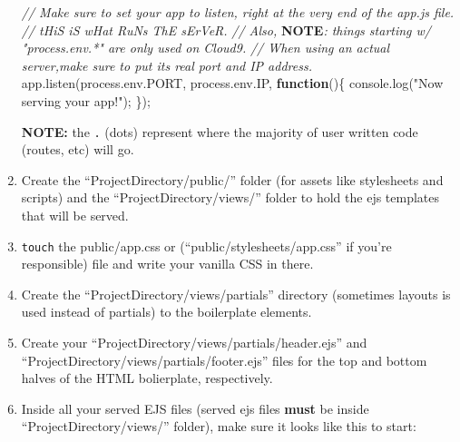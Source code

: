 \documentclass[11pt]{article}
\newenvironment{Shaded}{}{}
\newcommand{\KeywordTok}[1]{\textcolor[rgb]{0.00,0.44,0.13}{\textbf{{#1}}}}
\newcommand{\StringTok}[1]{\textcolor[rgb]{0.25,0.44,0.63}{{#1}}}
\newcommand{\CommentTok}[1]{\textcolor[rgb]{0.38,0.63,0.69}{\textit{{#1}}}}
\newcommand{\AlertTok}[1]{\textcolor[rgb]{1.00,0.00,0.00}{\textbf{{#1}}}}
\newcommand{\NormalTok}[1]{{#1}}
\newcommand{\VariableTok}[1]{\textcolor[rgb]{0.10,0.09,0.49}{{#1}}}
\newcommand{\OperatorTok}[1]{\textcolor[rgb]{0.40,0.40,0.40}{{#1}}}
\newcommand{\AttributeTok}[1]{\textcolor[rgb]{0.49,0.56,0.16}{{#1}}}
\begin{document}
\begin{enumerate}
\begin{Shaded}
\begin{Highlighting}[]
 \CommentTok{// Make sure to set your app to listen, right at the very end of the app.js file.}
 \CommentTok{// tHiS iS wHat RuNs ThE sErVeR.}
 \CommentTok{// Also, }\AlertTok{NOTE}\CommentTok{: things starting w/ "process.env.*" are only used on Cloud9.}
 \CommentTok{//   When using an actual server,make sure to put its real port and IP address.}
 \VariableTok{app}\NormalTok{.}\AttributeTok{listen}\NormalTok{(}\VariableTok{process}\NormalTok{.}\VariableTok{env}\NormalTok{.}\AttributeTok{PORT}\OperatorTok{,} \VariableTok{process}\NormalTok{.}\VariableTok{env}\NormalTok{.}\AttributeTok{IP}\OperatorTok{,} \KeywordTok{function}\NormalTok{()}\OperatorTok{\{}
 \VariableTok{console}\NormalTok{.}\AttributeTok{log}\NormalTok{(}\StringTok{"Now serving your app!"}\NormalTok{)}\OperatorTok{;}
 \OperatorTok{\}}\NormalTok{)}\OperatorTok{;}
\end{Highlighting}
\end{Shaded}

  \textbf{NOTE:} the \texttt{.} (dots) represent where the majority of
  user written code (routes, etc) will go.
\item
  Create the ``ProjectDirectory/public/'' folder (for assets like
  stylesheets and scripts) and the ``ProjectDirectory/views/'' folder to
  hold the ejs templates that will be served.
\item
  \texttt{touch} the public/app.css or (``public/stylesheets/app.css''
  if you're responsible) file and write your vanilla CSS in there.
\item
  Create the ``ProjectDirectory/views/partials'' directory (sometimes
  layouts is used instead of partials) to the boilerplate elements.
\item
  Create your ``ProjectDirectory/views/partials/header.ejs'' and
  ``ProjectDirectory/views/partials/footer.ejs'' files for the top and
  bottom halves of the HTML bolierplate, respectively.
\item
  Inside all your served EJS files (served ejs files \textbf{must} be
  inside ``ProjectDirectory/views/'' folder), make sure it looks like
  this to start:
\end{enumerate}

\begin{Shaded}
\end{Shaded}
\end{document}
